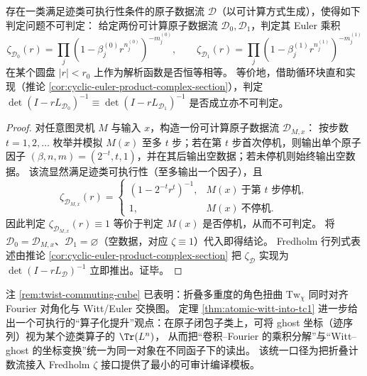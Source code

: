 \begin{theorem}\label{thm:operator-fredholm-zeta-equality-undecidable}
存在一类满足迹类可执行性条件的原子数据流 \(\mathcal D\)（以可计算方式生成），使得如下判定问题不可判定：
给定两份可计算原子数据流 \(\mathcal D_0,\mathcal D_1\)，判定其 Euler 乘积
\[
\zeta_{\mathcal D_0}(r)=\prod_{j}(1-\beta^{(0)}_j r^{n^{(0)}_j})^{-m^{(0)}_j},
\qquad
\zeta_{\mathcal D_1}(r)=\prod_{j}(1-\beta^{(1)}_j r^{n^{(1)}_j})^{-m^{(1)}_j}
\]
在某个圆盘 \(|r|<r_0\) 上作为解析函数是否恒等相等。
等价地，借助循环块直和实现（推论 \ref{cor:cyclic-euler-product-complex-section}），判定
\(
\det(I-rL_{\mathcal D_0})^{-1}\equiv \det(I-rL_{\mathcal D_1})^{-1}
\)
是否成立亦不可判定。
\end{theorem}

\begin{proof}
对任意图灵机 \(M\) 与输入 \(x\)，构造一份可计算原子数据流 \(\mathcal D_{M,x}\)：
按步数 \(t=1,2,\dots\) 枚举并模拟 \(M(x)\) 至多 \(t\) 步；若在第 \(t\) 步首次停机，则输出单个原子因子 \((\beta,n,m)=(2^{-t},t,1)\)，并在其后输出空数据；若未停机则始终输出空数据。
该流显然满足迹类可执行性（至多输出一个因子），且
\[
\zeta_{\mathcal D_{M,x}}(r)=
\begin{cases}
(1-2^{-t}r^{t})^{-1},& M(x)\ \text{于第 }t\text{ 步停机},\\
1,& M(x)\ \text{不停机}.
\end{cases}
\]
因此判定 \(\zeta_{\mathcal D_{M,x}}(r)\equiv 1\) 等价于判定 \(M(x)\) 是否停机，从而不可判定。
将 \(\mathcal D_0=\mathcal D_{M,x}\)、\(\mathcal D_1=\varnothing\)（空数据，对应 \(\zeta\equiv 1\)）代入即得结论。
Fredholm 行列式表述由推论 \ref{cor:cyclic-euler-product-complex-section} 把 \(\zeta_{\mathcal D}\) 实现为 \(\det(I-rL_{\mathcal D})^{-1}\) 立即推出。证毕。
\end{proof}

\begin{remark}\label{rem:operator-fourier-witt-unification}
注 \ref{rem:twist-commuting-cube} 已表明：折叠多重度的角色扭曲 \(\mathrm{Tw}_\chi\) 同时对齐 Fourier 对角化与 Witt/Euler 交换图。
定理 \ref{thm:atomic-witt-into-tc1} 进一步给出一个可执行的“算子化提升”观点：在原子闭包子类上，可将 ghost 坐标（迹序列）视为某个迹类算子的 \(\Tr(L^n)\)，
从而把“卷积--Fourier 的乘积分解”与“Witt--ghost 的坐标变换”统一为同一对象在不同函子下的读出。
该统一口径为把折叠计数流接入 Fredholm \(\zeta\) 接口提供了最小的可审计编译模板。
\end{remark}

\endinput
